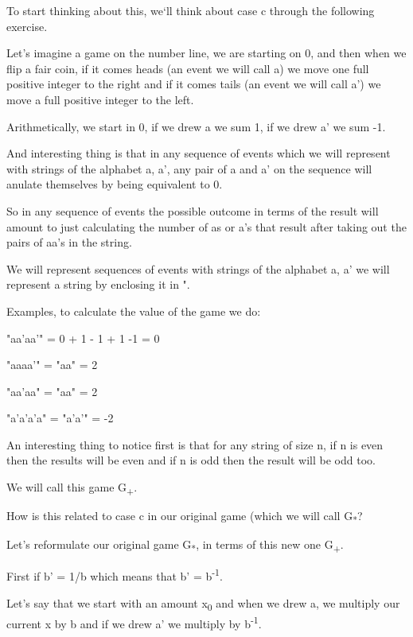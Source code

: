 \documentclass[12pt,reqno]{amsart}
\begin{document}
To start thinking about this, we`ll think about case c through the following exercise. 

Let's imagine a game on the number line, we are starting on 0, and then when we flip a fair coin, if it comes heads (an event we will call a) we move one full positive integer to the right and if it comes tails (an event we will call a') we move a full positive integer to the left.

Arithmetically, we start in 0, if we drew a we sum 1, if we drew a' we sum -1.

And interesting thing is that in any sequence of events which we will represent with strings of the alphabet {a, a'}, any pair of a and a' on the sequence will anulate themselves by being equivalent to 0.

So in any sequence of events the possible outcome in terms of the result will amount to just calculating the number of as or a's that result after taking out the pairs of aa's in the string.

We will represent sequences of events with strings of the alphabet {a, a'} we will represent a string by enclosing it in ".

Examples, to calculate the value of the game we do: 

"aa'aa'" = 0 + 1 - 1 + 1 -1 = 0 

"aaaa'" = "aa" =  2

"aa'aa" = "aa" = 2

"a'a'a'a" = "a'a'" = -2

An interesting thing to notice first is that for any string of size n, if n is even then the results will be even and if n is odd then the result will be odd too.

We will call this game G\textsubscript{+}.

How is this related to case c in our original game (which we will call G\textsubscript{*}?

Let's reformulate our original game G\textsubscript{*},  in terms of this new one G\textsubscript{+}.

First if b' = 1/b which means that b' = b\textsuperscript{-1}.

Let's say that we start with an amount x\textsubscript{0} and when we drew a, we multiply our current x by b and if we drew a' we multiply by b\textsuperscript{-1}.
\end{document}
